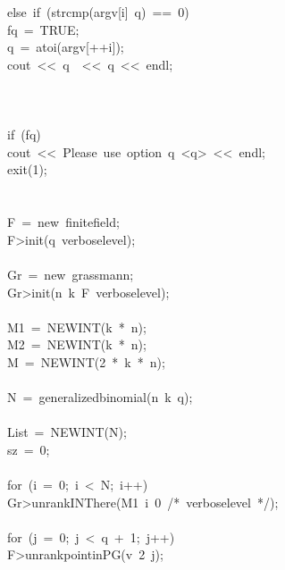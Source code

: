 \begin{tabbing}
\>\>else\ if\ (strcmp(argv[i]\ q)\ ==\ 0)\ \\[0pt]
\>\>\>fq\ =\ TRUE;\\[0pt]
\>\>\>q\ =\ atoi(argv[++i]);\\[0pt]
\>\>\>cout\ <<\ q\ \ <<\ q\ <<\ endl;\\[0pt]
\>\>\>\\[0pt]
\>\>\\[0pt]
\\[0pt]
\>if\ (fq)\ \\[0pt]
\>\>cout\ <<\ Please\ use\ option\ q\ <q>\ <<\ endl;\\[0pt]
\>\>exit(1);\\[0pt]
\>\>\\[0pt]
\\[0pt]
\>F\ =\ new\ finitefield;\\[0pt]
\>F>init(q\ verboselevel);\\[0pt]
\\[0pt]
\>Gr\ =\ new\ grassmann;\\[0pt]
\>Gr>init(n\ k\ F\ verboselevel);\\[0pt]
\\[0pt]
\>M1\ =\ NEWINT(k\ *\ n);\\[0pt]
\>M2\ =\ NEWINT(k\ *\ n);\\[0pt]
\>M\ =\ NEWINT(2\ *\ k\ *\ n);\\[0pt]
\\[0pt]
\>N\ =\ generalizedbinomial(n\ k\ q);\\[0pt]
\\[0pt]
\>List\ =\ NEWINT(N);\\[0pt]
\>sz\ =\ 0;\\[0pt]
\\[0pt]
\>for\ (i\ =\ 0;\ i\ <\ N;\ i++)\ \\[0pt]
\>\>Gr>unrankINThere(M1\ i\ 0\ /*\ verboselevel\ */);\\[0pt]
\>\>\\[0pt]
\>\>for\ (j\ =\ 0;\ j\ <\ q\ +\ 1;\ j++)\ \\[0pt]
\>\>\>F>unrankpointinPG(v\ 2\ j);\\[0pt]

\end{tabbing}
